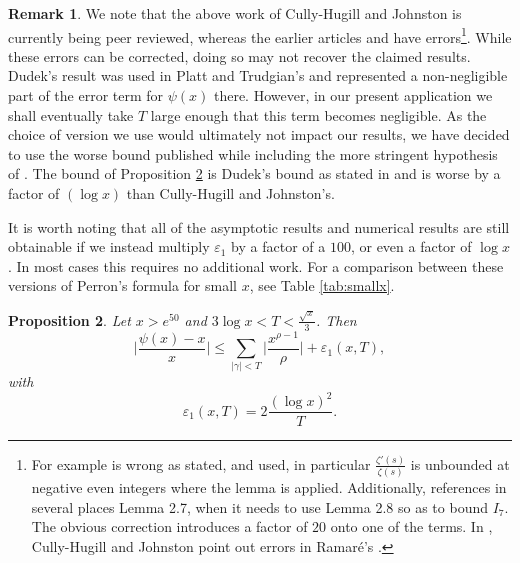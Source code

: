\documentclass[10pt]{amsart}
\newtheorem{prop}{Proposition}[section]
\theoremstyle{definition}
\newtheorem{Rem}[prop]{Remark}
\numberwithin{equation}{section}
\begin{document}
\begin{Rem}\label{rem:perron}
We note that the above work \cite{CulJoh21} of Cully-Hugill and Johnston is currently being peer reviewed, whereas the earlier articles \cite{Dud16} and \cite{Ram16} have errors\footnote{For example \cite[Lemma 2.3]{Dud16} is wrong as stated, and used, in particular $\frac{\zeta'(s)}{\zeta(s)}$ is unbounded at negative even integers where the lemma is applied. Additionally, \cite[Section 2.1]{Dud16} references in several places Lemma 2.7, when it needs to use Lemma 2.8 so as to bound $I_7$. The obvious correction introduces a factor of $20$ onto one of the terms. In \cite{CulJoh21}, Cully-Hugill and Johnston point out errors in Ramar\'e's \cite{Ram16}.}. 
While these errors can be corrected, doing so may not recover the claimed results.
Dudek's result was used in Platt and Trudgian's \cite{PlaTru21ET} and represented a non-negligible part of the error term for $\psi(x)$ there.
However, in our present application we shall eventually take $T$ large enough that this term becomes negligible. 
As the choice of version we use would ultimately not impact our results, we have decided to use the worse bound published while including the more stringent hypothesis of \cite[Theorem 1.2]{CulJoh21}.
The bound of Proposition \ref{Perron-exp} is Dudek's bound as stated in \cite[Thm 1.3]{Dud16} and is worse by a factor of $(\log x)$ than Cully-Hugill and Johnston's. 

It is worth noting that all of the asymptotic results and numerical  results are still obtainable if we instead multiply $\varepsilon_1$ by a factor of a $100$, or even a factor of $ \log x $.
 In most cases this requires no additional work. 
For a comparison between these versions of Perron's formula for small $x$, see Table \ref{tab:smallx}.
\end{Rem}
\begin{prop}\label{Perron-exp}
Let $x> e^{50}$ and $3\log x<T< \frac{\sqrt x}{3}$. Then 
\begin{equation}\label{bnd-Epsi}
\Big|\frac{\psi(x) - x}x\Big| \le \sum_{|\gamma| < T} \Big| \frac{x^{\rho-1}}{\rho} \Big|
+  \varepsilon_1(x,T) ,
\end{equation}
with 
\begin{equation}\label{def-eps1}
\varepsilon_1(x,T) = 2\frac{(\log x)^2}{T}.
\end{equation}
\end{prop}
\end{document}
